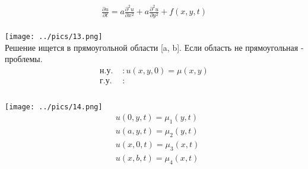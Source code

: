 \documentclass[12pt,a4paper]{article}
\begin{document}
	\begin{align*}
	\frac{\partial u }{\partial t}  = a \frac{\partial^2 u}{\partial x^2} + a \frac{\partial^2 u}{\partial y^2} + f(x,y,t)
	\end{align*}\\
	\texttt{[image: ../pics/13.png]}\\
	Решение ищется в прямоугольной области [a, b]. Если область не прямоугольная - проблемы.\\
	\begin{align*}
	\text{н.у. }&:u(x,y,0) = \mu(x,y)\\
	\text{г.у. }&:\\
	\end{align*}\\
	\texttt{[image: ../pics/14.png]}\\
	\begin{align*}
	&u(0,y,t) = \mu_1(y,t)\\
	&u(a,y,t) = \mu_2(y,t)\\
	&u(x,0,t) = \mu_3(x,t)\\
	&u(x,b,t) = \mu_4(x,t)\\
	\end{align*}
\end{document}
